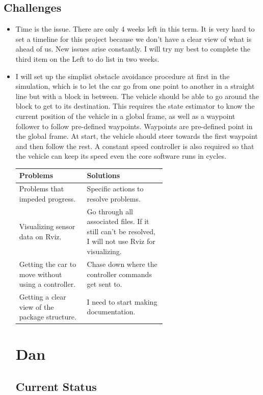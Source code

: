 \documentclass[compsoc,draftclsnofoot,onecolumn,10pt]{IEEEtran}
\begin{document}
\subsection{Challenges}
	\begin{itemize}
		\item Time is the issue. There are only 4 weeks left in this term. It is very hard to set a timeline for this project because we don't have a clear view of what is ahead of us. New issues arise constantly. I will try my best to complete the third item on the Left to do list in two weeks.
		\item I will set up the simplist obstacle avoidance procedure at first in the simulation, which is to let the car go from one point to another in a straight line but with a block in between. The vehicle should be able to go around the block to get to its destination. This requires the state estimator to know the current position of the vehicle in a global frame, as well as a waypoint follower to follow pre-defined waypoints. Waypoints are pre-defined point in the global frame. At start, the vehicle should steer towards the first waypoint and then follow the rest. A constant speed controller is also required so that the vehicle can keep its speed even the core software runs in cycles.   
\begin{tabular}{|p{0.3\linewidth}|p{0.3\linewidth}|}
	\hline
	\textbf{Problems} & \textbf{Solutions}\\
	\hline
	Problems that impeded progress. & Specific actions to resolve problems.\\
	\hline
	Visualizing sensor data on Rviz. & Go through all associated files. If it still can't be resolved, I will not use Rviz for visualizing. \\
	\hline
	Getting the car to move without using a controller. & Chase down where the controller commands get sent to. \\
	\hline
	Getting a clear view of the package structure. & I need to start making documentation. \\
	\hline
\end{tabular}

\section{Dan}
\subsection{Current Status}


\end{itemize}
\end{document}
